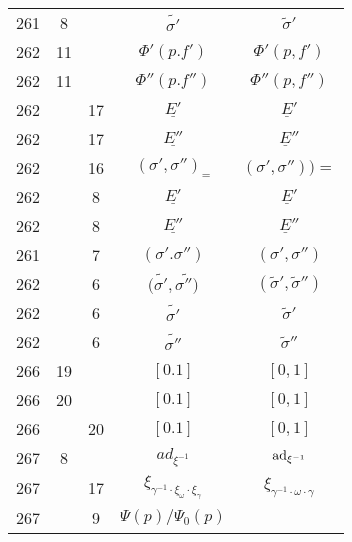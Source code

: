 \documentclass[a4paper,11pt]{article}
\begin{document}
\begin{center}
\begin{tabular}{|c|c|c|c|c|}
    261 & \hphantom{0}8 & & $\widetilde{ \sigma' }$ & $\widetilde{ \sigma }'$ \\
    262 & 11 & & $\Phi'( p. f' )$ & $\Phi'( p, f' )$ \\
    262 & 11 & & $\Phi''( p. f'' )$ & $\Phi''( p, f'' )$ \\
    262 & & 17 & $\underline{ E' }$ & $\underline{ E }'$ \\
    262 & & 17 & $\underline{ E'' }$ & $\underline{ E }''$ \\
    262 & & 16 & $( \sigma', \sigma'' )_{ = }$
           & $( \sigma', \sigma'' ) ) =$ \\
    262 & & \hphantom{0}8 & $\underline{ E' }$ & $\underline{ E }'$ \\
    262 & & \hphantom{0}8 & $\underline{ E'' }$ & $\underline{ E }''$ \\
    261 & & \hphantom{0}7 & $( \sigma'. \sigma'' )$ & $( \sigma', \sigma'' )$ \\
    262 & & \hphantom{0}6 & $( \widetilde{ \sigma' }, \widetilde{ \sigma'' ) }$
           & $( \widetilde{ \sigma }', \widetilde{ \sigma }'' )$ \\
    262 & & \hphantom{0}6 & $\widetilde{ \sigma' }$ & $\widetilde{ \sigma }'$ \\
    262 & & \hphantom{0}6 & $\widetilde{ \sigma'' }$ & $\widetilde{ \sigma }''$ \\
    266 & 19 & & $[ 0. 1 ]$ & $[ 0, 1 ]$ \\
    266 & 20 & & $[ 0. 1 ]$ & $[ 0, 1 ]$ \\
    266 & & 20 & $[ 0. 1 ]$ & $[ 0, 1 ]$ \\
    267 & \hphantom{0}8 & & $ad_{ \xi^{ -1 } }$ & $\mathrm{ad}_{ \xi^{ -1 } }$ \\
    267 & & 17 & $\xi_{ \gamma^{ - 1 } \cdot \xi_{ \omega } \cdot \xi_{ \gamma } }$
           & $\xi_{ \gamma^{ - 1 } \cdot \omega \cdot \gamma }$ \\[0.3em]
    267 & & \hphantom{0}9 & $\Psi( p ) / \Psi_{ 0 }( p )$

\end{tabular}
\end{center}
\end{document}
